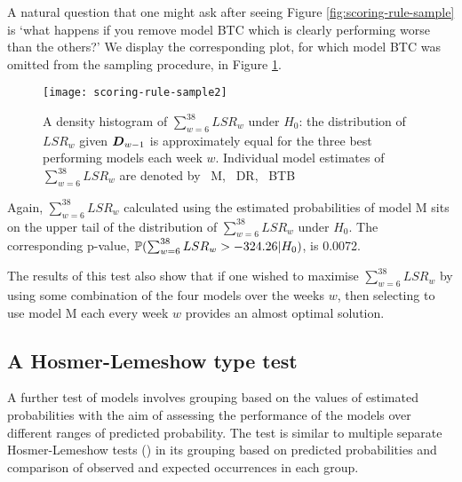 A natural question that one might ask after seeing Figure \ref{fig:scoring-rule-sample} is `what happens if you remove
model BTC which is clearly performing worse than the others?' We display the corresponding plot, for which model BTC was
omitted from the sampling procedure, in Figure \ref{fig:scoring-rule-sample2}.
\begin{figure}[htp]
\begin{center}
\texttt{[image: scoring-rule-sample2]}
\caption{A density histogram of \(\sum_{w=6}^{38} LSR_w\) under \(H_0\): the distribution of \(LSR_w\) given
\(\boldsymbol{D}_{w-1}\) is approximately equal for the three best performing models each week \(w\). Individual model estimates
of \(\sum_{w=6}^{38} LSR_w\) are denoted by \protect\blueSolidLine\ M, \protect\redSolidLine\ DR,
\protect\blackSolidLine\ BTB}
\label{fig:scoring-rule-sample2}
\end{center}
\end{figure}
Again, \(\sum_{w=6}^{38} LSR_w\) calculated using the estimated probabilities of model M sits on the upper tail of the
distribution of \(\sum_{w=6}^{38} LSR_w\) under \(H_0\). The corresponding p-value, \(\mathbb{P}(\sum_{w=6}^{38} LSR_w >
-324.26 | H_0)\), is 0.0072.

The results of this test also show that if one wished to maximise \(\sum_{w=6}^{38} LSR_w\) by using some combination of
the four models over the weeks \(w\), then selecting to use model M each every week \(w\) provides an almost optimal
solution.

\subsection{A Hosmer-Lemeshow type test}

A further test of models involves grouping based on the values of estimated probabilities with the aim of assessing the
performance of the models over different ranges of predicted probability. The test is similar to multiple separate
Hosmer-Lemeshow tests (\cite{hosmer2013}) in its grouping based on predicted probabilities and comparison of observed
and expected occurrences in each group.

